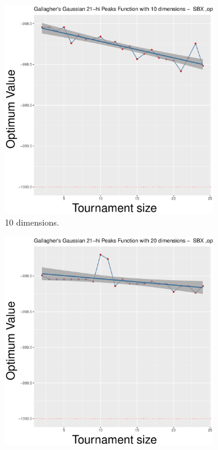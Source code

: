 \begin{figure}[!t]
	\begin{subfigure}[b]{0.33\textwidth}
		\centering
		\includegraphics[width=\textwidth]{img/SBX-10D/multimodal_sbx_22_dim_10.pdf}
		\caption{10 dimensions.}
	\end{subfigure}
	\begin{subfigure}[b]{0.33\textwidth}
		\centering
		\includegraphics[width=\textwidth]{img/SBX-20D/multimodal_sbx_22_dim_20.pdf}

\end{subfigure}
\end{figure}
